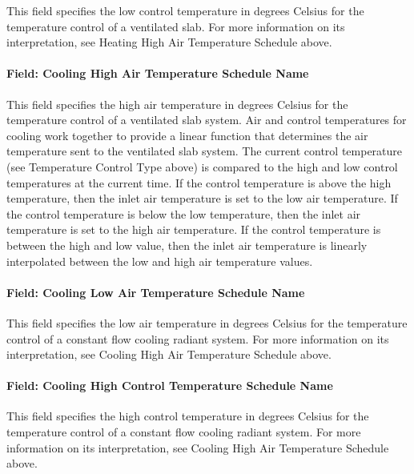 This field specifies the low control temperature in degrees Celsius for the temperature control of a ventilated slab. For more information on its interpretation, see Heating High Air Temperature Schedule above.

\paragraph{Field: Cooling High Air Temperature Schedule Name}\label{field-cooling-high-air-temperature-schedule-name}

This field specifies the high air temperature in degrees Celsius for the temperature control of a ventilated slab system. Air and control temperatures for cooling work together to provide a linear function that determines the air temperature sent to the ventilated slab system. The current control temperature (see Temperature Control Type above) is compared to the high and low control temperatures at the current time. If the control temperature is above the high temperature, then the inlet air temperature is set to the low air temperature. If the control temperature is below the low temperature, then the inlet air temperature is set to the high air temperature. If the control temperature is between the high and low value, then the inlet air temperature is linearly interpolated between the low and high air temperature values.

\paragraph{Field: Cooling Low Air Temperature Schedule Name}\label{field-cooling-low-air-temperature-schedule-name}

This field specifies the low air temperature in degrees Celsius for the temperature control of a constant flow cooling radiant system. For more information on its interpretation, see Cooling High Air Temperature Schedule above.

\paragraph{Field: Cooling High Control Temperature Schedule Name}\label{field-cooling-high-control-temperature-schedule-name-1}

This field specifies the high control temperature in degrees Celsius for the temperature control of a constant flow cooling radiant system. For more information on its interpretation, see Cooling High Air Temperature Schedule above.

